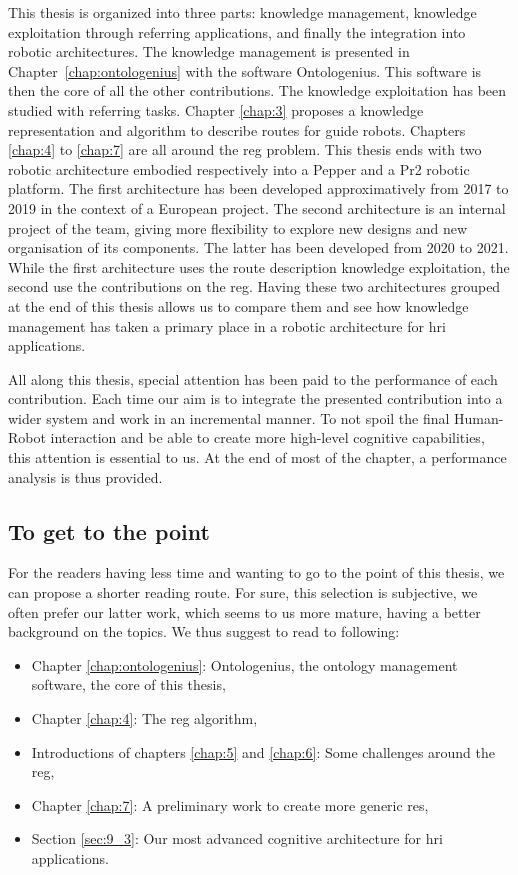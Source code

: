 This thesis is organized into three parts: knowledge management, knowledge exploitation through referring applications, and finally the integration into robotic architectures. The knowledge management is presented in Chapter~\ref{chap:ontologenius} with the software Ontologenius. This software is then the core of all the other contributions. The knowledge exploitation has been studied with referring tasks. Chapter \ref{chap:3} proposes a knowledge representation and algorithm to describe routes for guide robots. Chapters \ref{chap:4} to \ref{chap:7} are all around the \acrlong{reg} problem. This thesis ends with two robotic architecture embodied respectively into a Pepper and a Pr2 robotic platform. The first architecture has been developed approximatively from 2017 to 2019 in the context of a European project. The second architecture is an internal project of the team, giving more flexibility to explore new designs and new organisation of its components. The latter has been developed from 2020 to 2021. While the first architecture uses the route description knowledge exploitation, the second use the contributions on the \acrlong{reg}. Having these two architectures grouped at the end of this thesis allows us to compare them and see how knowledge management has taken a primary place in a robotic architecture for \acrlong{hri} applications.

All along this thesis, special attention has been paid to the performance of each contribution. Each time our aim is to integrate the presented contribution into a wider system and work in an incremental manner. To not spoil the final Human-Robot interaction and be able to create more high-level cognitive capabilities, this attention is essential to us. At the end of most of the chapter, a performance analysis is thus provided.

\subsection*{To get to the point}

For the readers having less time and wanting to go to the point of this thesis, we can propose a shorter reading route. For sure, this selection is subjective, we often prefer our latter work, which seems to us more mature, having a better background on the topics. We thus suggest to read to following:

\begin{itemize}
  \item Chapter \ref{chap:ontologenius}: Ontologenius, the ontology management software, the core of this thesis,
  \item Chapter \ref{chap:4}: The \acrlong{reg} algorithm,
  \item Introductions of chapters \ref{chap:5} and \ref{chap:6}: Some challenges around the \acrlong{reg},
  \item Chapter \ref{chap:7}: A preliminary work to create more generic \acrlong{re}s,
  \item Section \ref{sec:9_3}: Our most advanced cognitive architecture for \acrlong{hri} applications.
\end{itemize}

